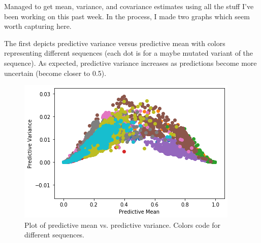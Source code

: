 \begin{Minutes}{}
\maketitle
{}
Managed to get mean, variance, and covariance estimates using all the stuff I've been working on this past week. In the process, I made two graphs which seem worth capturing here.

The first depicts predictive variance versus predictive mean with colors representing different sequences (each dot is for a maybe mutated variant of the sequence). As expected, predictive variance increases as predictions become more uncertain (become closer to 0.5).
\begin{figure}[t]
    \includegraphics[width=0.8\linewidth]{figures/predictive_variance_vs_predictive_mean}
    \caption{Plot of predictive mean vs. predictive variance. Colors code for different sequences.}
\end{figure}
\end{Minutes}
